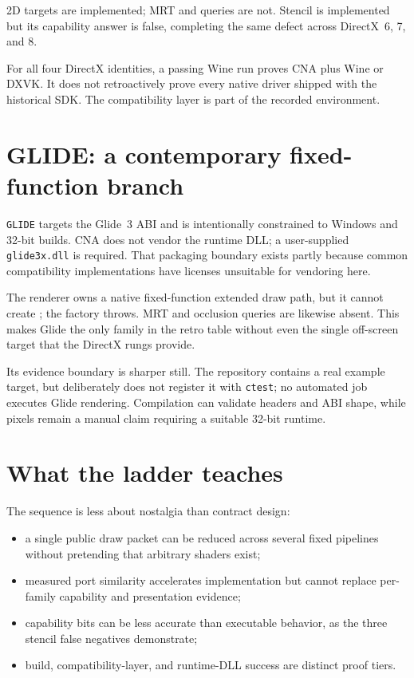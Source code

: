 2D targets are implemented; MRT and queries are not.  Stencil is implemented but its
capability answer is false, completing the same defect across DirectX~6, 7, and 8.

\begin{sourcenote}
For all four DirectX identities, a passing Wine run proves CNA plus Wine or DXVK.  It does not
retroactively prove every native driver shipped with the historical SDK.  The compatibility
layer is part of the recorded environment.
\end{sourcenote}

\section{GLIDE: a contemporary fixed-function branch}

\texttt{GLIDE} targets the Glide~3 ABI and is intentionally constrained to Windows and
32-bit builds.  CNA does not vendor the runtime DLL; a user-supplied \texttt{glide3x.dll} is
required.  That packaging boundary exists partly because common compatibility implementations
have licenses unsuitable for vendoring here.

The renderer owns a native fixed-function extended draw path, but it cannot create
; the factory throws.  MRT and occlusion queries are likewise absent.
This makes Glide the only family in the retro table without even the single off-screen target
that the DirectX rungs provide.

Its evidence boundary is sharper still.  The repository contains a real example target, but
deliberately does not register it with \texttt{ctest}; no automated job executes Glide
rendering.  Compilation can validate headers and ABI shape, while pixels remain a manual
claim requiring a suitable 32-bit runtime.

\section{What the ladder teaches}

The sequence is less about nostalgia than contract design:

\begin{itemize}
  \item a single public draw packet can be reduced across several fixed pipelines without
        pretending that arbitrary shaders exist;
  \item measured port similarity accelerates implementation but cannot replace per-family
        capability and presentation evidence;
  \item capability bits can be less accurate than executable behavior, as the three stencil
        false negatives demonstrate;
  \item build, compatibility-layer, and runtime-DLL success are distinct proof tiers.
\end{itemize}

